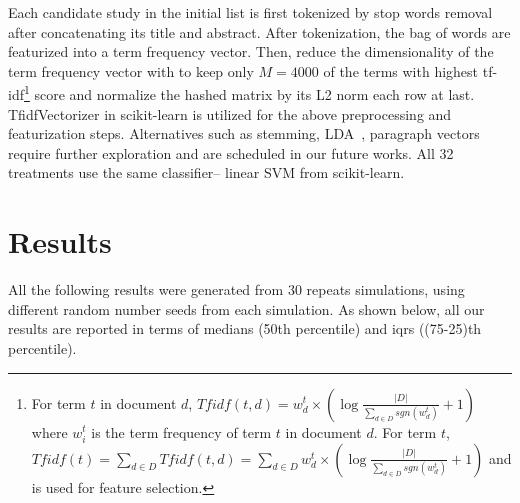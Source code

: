 \documentclass{svjour3}
\theoremstyle{break}
\begin{document}
Each candidate study in the initial list is first tokenized by stop words removal after concatenating its title and abstract. After tokenization, the bag of words are featurized into a term frequency vector. Then, reduce the dimensionality of the term frequency vector with to keep only $M=4000$ of the terms with highest tf-idf\footnote{For term $t$ in document $d$, $Tfidf(t, d)=w^t_d\times (\log \frac{|D|}{\sum_{d\in D} sgn(w^t_d)}+1)$ where $w^t_i$ is the term frequency of term $t$ in document $d$. For term $t$, $Tfidf(t) = \sum_{d\in D} Tfidf(t,d) = \sum_{d\in D} w^t_d \times (\log \frac{|D|}{\sum_{d\in D} sgn(w^t_d)}+1)$ and is used for feature selection.} score and normalize the hashed matrix by its L2 norm each row at last. TfidfVectorizer in scikit-learn is utilized for the above preprocessing and featurization steps. Alternatives such as stemming, LDA~\cite{blei2003latent}, paragraph vectors~\cite{le2014distributed} require further exploration and are scheduled in our future works. All 32 treatments use the same classifier-- linear SVM from scikit-learn.



\section{Results}
\label{subsect: Results}


All the following results were generated from 30 repeats
simulations, using different random number seeds from each simulation.
As shown below, all our results
are reported in terms of medians (50th percentile) and iqrs ((75-25)th percentile).
\end{document}
